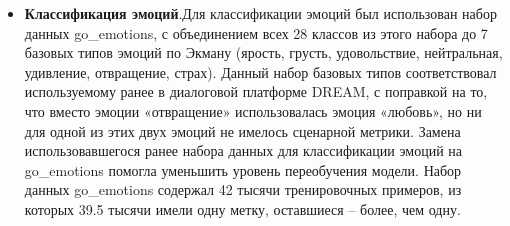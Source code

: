 \begin{itemize}
\item\textbf{Классификация эмоций}.Для классификации эмоций был использован набор данных {go\_emotions}\cite{go_emotions}, с объединением всех 28 классов из этого набора до 7 базовых типов эмоций по Экману (ярость, грусть, удовольствие, нейтральная, удивление, отвращение, страх). Данный набор базовых типов соответствовал используемому ранее в диалоговой платформе DREAM, с поправкой на то, что вместо эмоции «отвращение» использовалась эмоция «любовь», но ни для одной из этих двух эмоций не имелось сценарной метрики. Замена использовавшегося ранее набора данных для классификации эмоций на {go\_emotions} помогла уменьшить уровень переобучения модели.
 Набор данных go\_emotions содержал 42 тысячи тренировочных примеров, из которых 39.5 тысячи имели одну метку, оставшиеся -- более, чем одну. 


\end{itemize}
